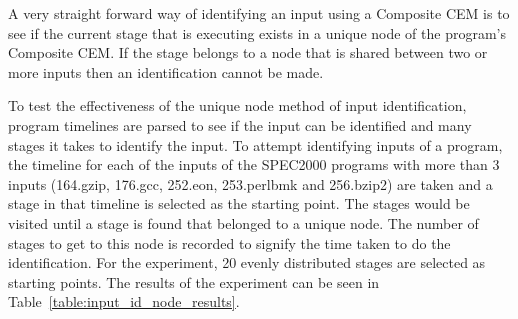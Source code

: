 A very straight forward way of identifying an
input using a Composite CEM is to see if the current stage that is executing
exists in a unique node of the program's Composite CEM. If the stage belongs to a
node that is shared between two or more inputs then an identification
cannot be made.


To test the effectiveness of the unique node method of input
identification, program timelines are
parsed to see if the input can be identified
and many stages it takes to identify the input. To attempt
identifying inputs of a program, the timeline for each of the inputs of the
SPEC2000 programs with more than 3 inputs (164.gzip, 176.gcc, 252.eon,
253.perlbmk and 256.bzip2) are taken and a stage
in that timeline is selected as the starting point. The
stages would be visited until a stage is found that belonged to a
unique node. The number of stages to get to this node is recorded to
signify the time taken to do the identification. For the experiment,
20 evenly distributed stages are selected as starting points. The
results of the experiment can be seen in
Table~\ref{table:input_id_node_results}.

